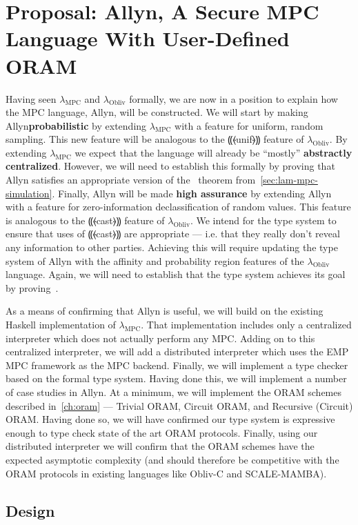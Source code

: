 \documentclass{report}
\newcommand{\lang}{Allyn\xspace}
\newcommand{\mpc}{\ensuremath{\lambda_{\mathrm{MPC}}}\xspace}
\newcommand{\obliv}{\ensuremath{\lambda_{\mathrm{Obliv}}}\xspace}
\begin{document}
\chapter{Proposal: \lang, A Secure MPC Language With User-Defined ORAM}
\label{ch:proposal}

Having seen \mpc and \obliv formally, we are now in a position to explain how the MPC language, \lang, will be constructed.
We will start by making \lang \textbf{probabilistic} by extending \mpc with a feature for uniform, random sampling. This new
feature will be analogous to the ⸨⦑unif⦒⸩ feature of \obliv. By extending \mpc we expect that the language will already be ``mostly''
\textbf{abstractly centralized}. However, we will need to establish this formally by proving that \lang satisfies an appropriate
version of the~ theorem from~\cref{sec:lam-mpc-simulation}. Finally, \lang will be made
\textbf{high assurance} by extending \lang with a feature for zero-information declassification of random values. This feature
is analogous to the ⸨⦑cast⦒⸩ feature of \obliv. We intend for the type system to ensure that uses of ⸨⦑cast⦒⸩ are appropriate
--- i.e. that they really don't reveal any information to other parties. Achieving this will require updating the type system
of \lang with the affinity and probability region features of the \obliv language. Again, we will need to establish that the
type system achieves its goal by proving~.

As a means of confirming that \lang is useful, we will build on the existing Haskell implementation of \mpc. That implementation
includes only a centralized interpreter which does not actually perform any MPC. Adding on to this centralized interpreter, we will
add a distributed interpreter which uses the EMP MPC framework as the MPC backend. Finally, we will implement a type checker based
on the formal type system. Having done this, we will implement a number of case studies in \lang. At a minimum, we will implement
the ORAM schemes described in~\cref{ch:oram} --- Trivial ORAM, Circuit ORAM, and Recursive (Circuit) ORAM. Having done so, we will
have confirmed our type system is expressive enough to type check state of the art ORAM protocols. Finally, using our distributed
interpreter we will confirm that the ORAM schemes have the expected asymptotic complexity (and should therefore be competitive with
the ORAM protocols in existing languages like Obliv-C and SCALE-MAMBA).

\section{Design}
\end{document}
